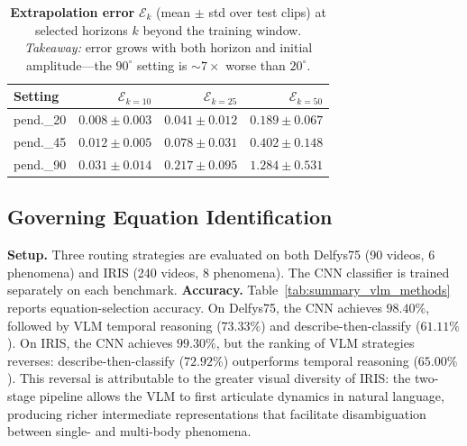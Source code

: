 \documentclass[runningheads]{llncs}
\begin{document}
\begin{table}[t]
  \centering
  \caption{\textbf{Extrapolation error} $\mathcal{E}_k$ (mean $\pm$ std over test clips) at selected horizons $k$ beyond the training window. \emph{Takeaway:} error grows with both horizon and initial amplitude---the $90^\circ$ setting is ${\sim}7\times$ worse than $20^\circ$.}
  \label{tab:extrapolation}
  \footnotesize
  \setlength{\tabcolsep}{5pt}
  \renewcommand{\arraystretch}{1.2}
  \begin{tabular}{@{}lrrr@{}}
    \toprule
    \textbf{Setting} & $\mathcal{E}_{k=10}$ & $\mathcal{E}_{k=25}$ & $\mathcal{E}_{k=50}$ \\
    \midrule
    pend.\_20 & $0.008 \pm 0.003$ & $0.041 \pm 0.012$ & $0.189 \pm 0.067$ \\
    pend.\_45 & $0.012 \pm 0.005$ & $0.078 \pm 0.031$ & $0.402 \pm 0.148$ \\
    pend.\_90 & $0.031 \pm 0.014$ & $0.217 \pm 0.095$ & $1.284 \pm 0.531$ \\
    \bottomrule
  \end{tabular}
\end{table}




\subsection{Governing Equation Identification}
\label{sec:exp_eq_identification}
\noindent
\textbf{Setup.} Three routing strategies are evaluated on both Delfys75 (90 videos, 6 phenomena) and IRIS (240 videos, 8 phenomena). The CNN classifier is trained separately on each benchmark.
\textbf{Accuracy.} Table~\ref{tab:summary_vlm_methods} reports equation-selection accuracy. On Delfys75, the CNN achieves $98.40\%$, followed by VLM temporal reasoning ($73.33\%$) and describe-then-classify ($61.11\%$). On IRIS, the CNN achieves $99.30\%$, but the ranking of VLM strategies reverses: describe-then-classify ($72.92\%$) outperforms temporal reasoning ($65.00\%$). This reversal is attributable to the greater visual diversity of IRIS: the two-stage pipeline allows the VLM to first articulate dynamics in natural language, producing richer intermediate representations that facilitate disambiguation between single- and multi-body phenomena.
\end{document}
